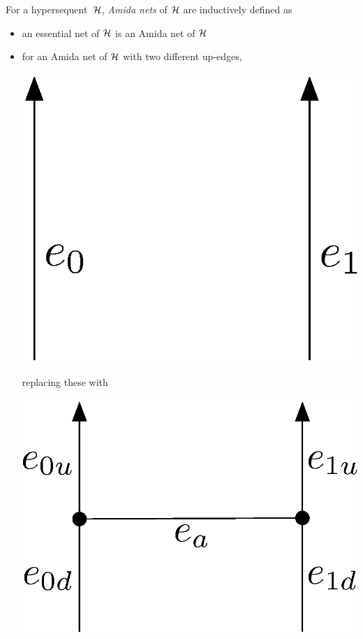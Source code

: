  \begin{definition}
  \label{def:amidanets}
For a hypersequent~$\mathcal{H}$,
\textit{Amida nets} of $\mathcal{H}$ are inductively
  defined as
\begin{itemize}
 \item an essential net of $\mathcal{H}$ is an Amida net of $\mathcal{H}$
 \item for an Amida net of $\mathcal{H}$ with two different up-edges,
	\begin{center}
	 \includegraphics[scale=0.4]{twoedges.eps}
	\end{center}
       replacing these with
	\begin{center}
	 \includegraphics[scale=0.4]{twoedges_amida.eps}

\end{center}
\end{itemize}
\end{definition}
